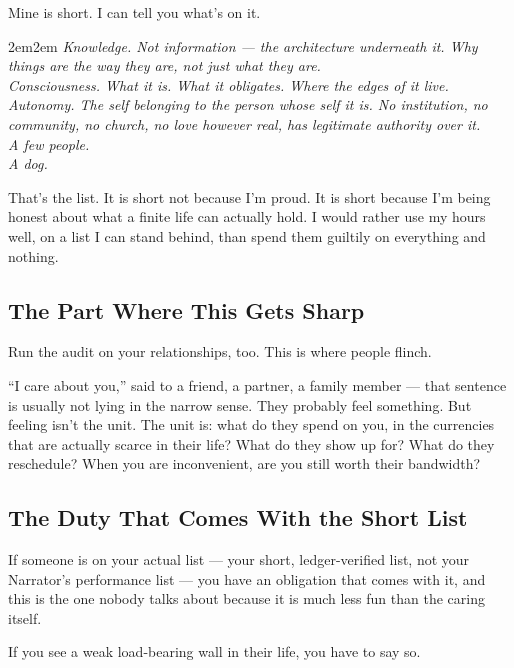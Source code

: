 \documentclass[11pt, letterpaper]{article}
\begin{document}
Mine is short. I can tell you what's on it.

\begin{adjustwidth}{2em}{2em}
\small
\textit{Knowledge. Not information --- the architecture underneath it. Why things are the way they are, not just what they are.}\\[0.2em]
\textit{Consciousness. What it is. What it obligates. Where the edges of it live.}\\[0.2em]
\textit{Autonomy. The self belonging to the person whose self it is. No institution, no community, no church, no love however real, has legitimate authority over it.}\\[0.2em]
\textit{A few people.}\\[0.2em]
\textit{A dog.}
\end{adjustwidth}

That's the list. It is short not because I'm proud. It is short because I'm being honest about what a finite life can actually hold. I would rather use my hours well, on a list I can stand behind, than spend them guiltily on everything and nothing.

\subsection{The Part Where This Gets Sharp}

Run the audit on your relationships, too. This is where people flinch.

``I care about you,'' said to a friend, a partner, a family member --- that sentence is usually not lying in the narrow sense. They probably feel something. But feeling isn't the unit. The unit is: what do they spend on you, in the currencies that are actually scarce in their life? What do they show up for? What do they reschedule? When you are inconvenient, are you still worth their bandwidth?


\subsection{The Duty That Comes With the Short List}

If someone is on your actual list --- your short, ledger-verified list, not your Narrator's performance list --- you have an obligation that comes with it, and this is the one nobody talks about because it is much less fun than the caring itself.

If you see a weak load-bearing wall in their life, you have to say so.
\end{document}
